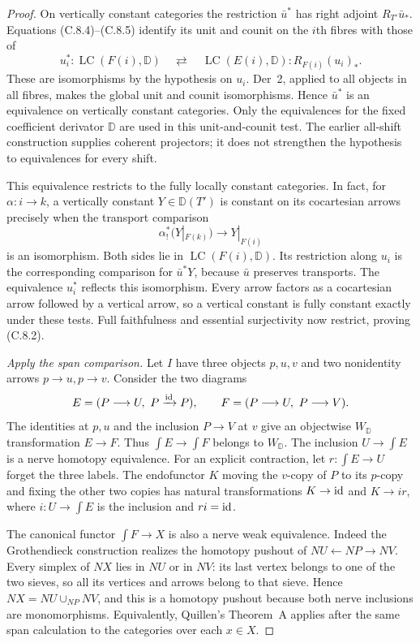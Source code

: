 \begin{proof}
On vertically constant categories the restriction $\bar u^*$
has right adjoint $R_{T'}\bar u_*$. Equations (C.8.4)--(C.8.5)
identify its unit and counit on the $i$th fibres with those of
\[
 u_i^*:\operatorname{LC}(F(i),\mathbb D)
 \quad\rightleftarrows\quad
 \operatorname{LC}(E(i),\mathbb D):R_{F(i)}(u_i)_*.
\]
These are isomorphisms by the hypothesis on $u_i$. Der~2,
applied to all objects in all fibres, makes the global unit
and counit isomorphisms. Hence $\bar u^*$ is an equivalence
on vertically constant categories.
Only the equivalences for the fixed coefficient derivator
$\mathbb D$ are used in this unit-and-counit test. The earlier
all-shift construction supplies coherent projectors; it does
not strengthen the hypothesis to equivalences for every shift.

This equivalence restricts to the fully locally constant
categories. In fact, for $\alpha:i\to k$, a vertically
constant $Y\in\mathbb D(T')$ is constant on its cocartesian
arrows precisely when the transport comparison
\[
 \alpha_!^*(Y|_{F(k)})\longrightarrow Y|_{F(i)}
\]
is an isomorphism. Both sides lie in
$\operatorname{LC}(F(i),\mathbb D)$. Its restriction along
$u_i$ is the corresponding comparison for $\bar u^*Y$,
because $\bar u$ preserves transports. The equivalence
$u_i^*$ reflects this isomorphism. Every arrow factors as a
cocartesian arrow followed by a vertical arrow, so a vertical
constant is fully constant exactly under these tests.
Full faithfulness and essential surjectivity now restrict,
proving (C.8.2).

\emph{Apply the span comparison.}
Let $I$ have three objects $p,u,v$ and two nonidentity arrows
$p\to u,p\to v$. Consider the two diagrams
\[
 E=(P\longrightarrow U,\ P\xrightarrow{\mathrm{id}}P),
 \qquad
 F=(P\longrightarrow U,\ P\longrightarrow V).
\]
The identities at $p,u$ and the inclusion $P\to V$ at $v$
give an objectwise $W_{\mathbb D}$ transformation $E\to F$.
Thus $\int E\to\int F$ belongs to $W_{\mathbb D}$.
The inclusion $U\to\int E$ is a nerve homotopy equivalence.
For an explicit contraction, let $r:\int E\to U$ forget the
three labels. The endofunctor $K$ moving the $v$-copy of $P$
to its $p$-copy and fixing the other two copies has natural
transformations $K\to\mathrm{id}$ and $K\to ir$, where
$i:U\to\int E$ is the inclusion and $ri=\mathrm{id}$.

The canonical functor $\int F\to X$ is also a nerve weak
equivalence. Indeed the Grothendieck construction realizes
the homotopy pushout of $NU\leftarrow NP\to NV$. Every
simplex of $NX$ lies in $NU$ or in $NV$: its last vertex
belongs to one of the two sieves, so all its vertices and
arrows belong to that sieve. Hence
$NX=NU\cup_{NP}NV$, and this is a homotopy pushout because
both nerve inclusions are monomorphisms. Equivalently,
Quillen's Theorem~A applies after the same span calculation
to the categories over each $x\in X$.


\end{proof}
